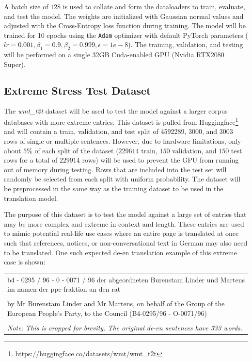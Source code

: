 \documentclass[11pt,a4paper]{article}
\begin{document}
A batch size of $128$ is used to collate and form the dataloaders to train, evaluate, and test the model. The weights are initialized with Gaussian normal values and adjusted with the Cross-Entropy loss function during training. The model will be trained for 10 epochs using the \verb|Adam| optimizer with default PyTorch parameters ($lr=0.001, \beta_1=0.9, \beta_2=0.999, \epsilon=1e-8$). The training, validation, and testing will be performed on a single 32GB Cuda-enabled GPU (Nvidia RTX2080 Super).

\subsection{Extreme Stress Test Dataset}
The \textit{wmt\_t2t} dataset \cite{bojar-EtAl:2014:W14-33} will be used to test the model against a larger corpus databases with more extreme entries. This dataset is pulled from Huggingface\footnote{https://huggingface.co/datasets/wmt/wmt\_t2t} and will contain a train, validation, and test split of 4592289, 3000, and 3003 rows of single or multiple sentences. However, due to hardware limitations, only about $5\%$ of each split of the dataset ($229614$ train, $150$ validation, and $150$ test rows for a total of $229914$ rows) will be used to prevent the GPU from running out of memory during testing. Rows that are included into the test set will randomly be selected from each split with uniform probability. The dataset will be preprocessed in the same way as the training dataset to be used in the translation model. 

The purpose of this dataset is to test the model against a large set of entries that may be more complex and extreme in context and length. These entries are used to mimic potential real-life use cases where an entire page is translated at once such that references, notices, or non-conversational text in German may also need to be translated. One such expected de-en translation example of this extreme case is shown:

\begin{center}
\begin{tabular}{p{2.5in}}
    \hline
    b4 - 0295 / 96 - 0 - 0071 / 96 der abgeordneten Burenstam Linder und Martens im namen der ppe-fraktion an den rat\\
    \\
    by Mr Burenstam Linder and Mr Martens, on behalf of the Group of the European People's Party, to the Council (B4-0295/96 - O-0071/96)\\
    \hline
    \\
    \textit{Note: This is cropped for brevity. The original de-en sentences have \~333 words.}
\end{tabular}
\end{center}
\end{document}
